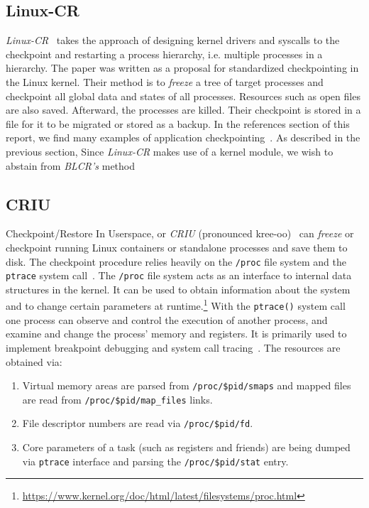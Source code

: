 \documentclass[a4paper, 11pt, english]{report}
\begin{document}
\subsection{Linux-CR}
\label{sec:linux-cr}
\textit{Linux-CR}~\cite{laadan2010linux} takes the approach of designing kernel drivers and syscalls to the checkpoint and restarting a process hierarchy, i.e. multiple processes in a hierarchy. The paper was written as a proposal for standardized checkpointing in the Linux kernel. Their method is to \textit{freeze} a tree of target processes and checkpoint all global data and states of all processes. Resources such as open files are also saved. Afterward, the processes are killed. Their checkpoint is stored in a file for it to be migrated or stored as a backup.
In the references section of this report, we find many examples of application checkpointing~\cites{paul2006BLCR}{zhong2001crak}{laadan2005commodity}{osman2003zap}. As described in the previous section, Since \textit{Linux-CR} makes use of a kernel module, we wish to abstain from \textit{BLCR's} method

\subsection{CRIU}
\label{sec:criu}
Checkpoint/Restore In Userspace, or \textit{CRIU} (pronounced kree-oo)~\cite{criu} can \textit{freeze} or checkpoint running Linux containers or standalone processes and save them to disk. The checkpoint procedure relies heavily on the \texttt{/proc} file system and the \texttt{ptrace} system call~\cite{criu}. The \texttt{/proc} file system acts as an interface to internal data structures in the kernel. It can be used to obtain information about the system and to change certain parameters at runtime.\footnote{\url{https://www.kernel.org/doc/html/latest/filesystems/proc.html}} With the \texttt{ptrace()} system call one process can observe and control the execution of another process, and examine and change the process' memory and registers. It is primarily used to implement breakpoint debugging and system call tracing~\cite{ptrace}. The resources are obtained via:

\begin{enumerate}
	\item Virtual memory areas are parsed from \texttt{/proc/\$pid/smaps} and mapped files are read from \texttt{/proc/\$pid/map\_files} links.
	\item File descriptor numbers are read via \texttt{/proc/\$pid/fd}.
	\item Core parameters of a task (such as registers and friends) are being dumped via \texttt{ptrace} interface and parsing the \texttt{/proc/\$pid/stat} entry.
\end{enumerate} 
\end{document}
